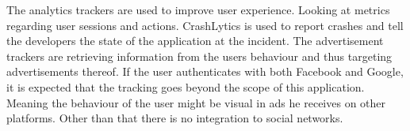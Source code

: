 The analytics trackers are used to improve user experience. Looking at metrics regarding user sessions and actions. CrashLytics is used to report crashes and tell the developers the state of the application at the incident. The advertisement trackers are retrieving information from the users behaviour and thus targeting advertisements thereof. If the user authenticates with both Facebook and Google, it is expected that the tracking goes beyond the scope of this application. Meaning the behaviour of the user might be visual in ads he receives on other platforms. Other than that there is no integration to social networks.       